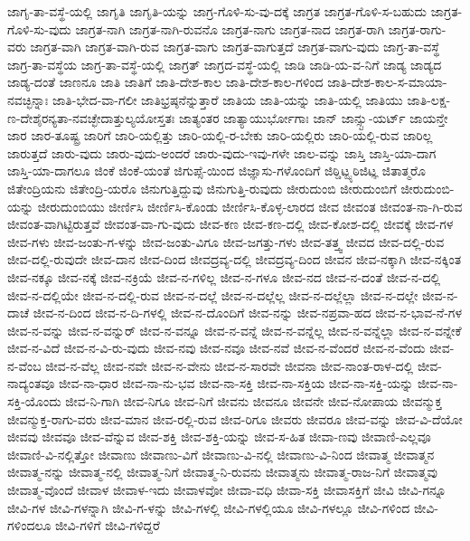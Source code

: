 {ಜಾಗೃ-ತಾ-ವಸ್ಥೆ-ಯಲ್ಲಿ
ಜಾಗೃತಿ
ಜಾಗೃತಿ-ಯನ್ನು
ಜಾಗ್ರ-ಗೊಳಿ-ಸು-ವು-ದಕ್ಕೆ
ಜಾಗ್ರತ
ಜಾಗ್ರತ-ಗೊಳಿ-ಸ-ಬಹುದು
ಜಾಗ್ರತ-ಗೊಳಿ-ಸು-ವುದು
ಜಾಗ್ರತ-ನಾಗಿ
ಜಾಗ್ರತ-ನಾಗಿ-ರುವನೊ
ಜಾಗ್ರತ-ನಾಗು
ಜಾಗ್ರತ-ನಾದ
ಜಾಗ್ರತ-ರಾಗಿ
ಜಾಗ್ರತ-ರಾಗು-ವರು
ಜಾಗ್ರತ-ವಾಗಿ
ಜಾಗ್ರತ-ವಾಗಿ-ರುವ
ಜಾಗ್ರತ-ವಾಗು
ಜಾಗ್ರತ-ವಾಗುತ್ತದೆ
ಜಾಗ್ರತ-ವಾಗು-ವುದು
ಜಾಗ್ರ-ತಾ-ವಸ್ಥೆ
ಜಾಗ್ರ-ತಾ-ವಸ್ಥೆಯ
ಜಾಗ್ರ-ತಾ-ವಸ್ಥೆ-ಯಲ್ಲಿ
ಜಾಗ್ರತ್
ಜಾಗ್ರದ-ವಸ್ಥೆ-ಯಲ್ಲಿ
ಜಾಡಿ
ಜಾಡಿ-ಯ-ವ-ನಿಗೆ
ಜಾಡ್ಯ
ಜಾಡ್ಯದ
ಜಾಡ್ಯ-ದಂತೆ
ಜಾಣನೂ
ಜಾತಿ
ಜಾತಿಗೆ
ಜಾತಿ-ದೇಶ-ಕಾಲ
ಜಾತಿ-ದೇಶ-ಕಾಲ-ಗಳಿಂದ
ಜಾತಿ-ದೇಶ-ಕಾಲ-ಸ-ಮಾಯಾ-ನವಚ್ಛಿನ್ನಾಃ
ಜಾತಿ-ಭೇದ-ವಾ-ಗಲೀ
ಜಾತಿಭ್ರಷ್ಠನೆನ್ನುತ್ತಾರೆ
ಜಾತಿಯ
ಜಾತಿ-ಯನ್ನು
ಜಾತಿ-ಯಲ್ಲಿ
ಜಾತಿಯು
ಜಾತಿ-ಲಕ್ಷ-ಣ-ದೇಶೈರನ್ಯತಾ-ನವಚ್ಛೇದಾತ್ತುಲ್ಯಯೋಸ್ತತಃ
ಜಾತ್ಯಂತರ
ಜಾತ್ಯಾಯುರ್ಭೋಗಾಃ
ಜಾನ್
ಜಾನ್ಸ್ಟು-ಯರ್ಟ್
ಜಾಯನ್ತೇ
ಜಾರ
ಜಾರ-ತೂಷ್ಟ್ರ
ಜಾರಿಗೆ
ಜಾರಿ-ಯಲ್ಲಿತ್ತು
ಜಾರಿ-ಯಲ್ಲಿ-ರ-ಬೇಕು
ಜಾರಿ-ಯಲ್ಲಿರು
ಜಾರಿ-ಯಲ್ಲಿ-ರುವ
ಜಾರಿಲ್ಲ
ಜಾರುತ್ತದೆ
ಜಾರು-ವುದು
ಜಾರು-ವುದು-ಅಂದರೆ
ಜಾರು-ವುದು-ಇವು-ಗಳೇ
ಜಾಲ-ವನ್ನು
ಜಾಸ್ತಿ
ಜಾಸ್ತಿ-ಯಾ-ದಾಗ
ಜಾಸ್ತಿ-ಯಾ-ದಾಗಲೂ
ಜಿಂಕೆ
ಜಿಂಕೆ-ಯಂತೆ
ಜಿಗುಪ್ಸೆ-ಯಿಂದ
ಜಿಜ್ಞಾಸು-ಗಳೊಂದಿಗೆ
ಜಿಠ್ಡಿಟ್ಝ್ಠಠಿಜಿಟ್ಞ
ಜಿತಾತ್ಮರೊ
ಜಿತೇಂದ್ರಿಯನು
ಜಿತೇಂದ್ರಿ-ಯರೊ
ಜಿನುಗುತ್ತಿದ್ದುವು
ಜಿನುಗುತ್ತಿ-ರುವುದು
ಜೀರುದುಂಬಿ
ಜೀರುದುಂಬಿಗೆ
ಜೀರುದುಂಬಿ-ಯನ್ನು
ಜೀರುದುಂಬಿಯು
ಜೀರ್ಣಿಸಿ
ಜೀರ್ಣಿಸಿ-ಕೊಂಡು
ಜೀರ್ಣಿಸಿ-ಕೊಳ್ಳ-ಲಾರದ
ಜೀವ
ಜೀವಂತ
ಜೀವಂತ-ನಾ-ಗಿ-ರುವ
ಜೀವಂತ-ವಾಗಿಟ್ಟಿರುತ್ತವೆ
ಜೀವಂತ-ವಾ-ಗು-ವುದು
ಜೀವ-ಕಣ
ಜೀವ-ಕಣ-ದಲ್ಲಿ
ಜೀವ-ಕೋಶ-ದಲ್ಲಿ
ಜೀವಕ್ಕೆ
ಜೀವ-ಗಳ
ಜೀವ-ಗಳು
ಜೀವ-ಜಂತು-ಗ-ಳನ್ನು
ಜೀವ-ಜಂತು-ವಿಗೂ
ಜೀವ-ಜಗತ್ತು-ಗಳು
ಜೀವ-ತತ್ತ್ವ
ಜೀವದ
ಜೀವ-ದಲ್ಲಿ-ರುವ
ಜೀವ-ದಲ್ಲಿ-ರುವುದೇ
ಜೀವ-ದಾನ
ಜೀವ-ದಿಂದ
ಜೀವದ್ರವ್ಯ-ದಲ್ಲಿ
ಜೀವದ್ರವ್ಯ-ದಿಂದ
ಜೀವನ
ಜೀವ-ನಕ್ಕಾಗಿ
ಜೀವ-ನಕ್ಕಿಂತ
ಜೀವ-ನಕ್ಕೂ
ಜೀವ-ನಕ್ಕೆ
ಜೀವ-ನಕ್ರಿಯೆ
ಜೀವ-ನ-ಗಳಿಲ್ಲ
ಜೀವ-ನ-ಗಳೂ
ಜೀವ-ನದ
ಜೀವ-ನ-ದಂತೆ
ಜೀವ-ನ-ದಲ್ಲಿ
ಜೀವ-ನ-ದಲ್ಲಿಯೇ
ಜೀವ-ನ-ದಲ್ಲಿ-ರುವ
ಜೀವ-ನ-ದಲ್ಲೆ
ಜೀವ-ನ-ದಲ್ಲೆಲ್ಲ
ಜೀವ-ನ-ದಲ್ಲೆಲ್ಲಾ
ಜೀವ-ನ-ದಲ್ಲೇ
ಜೀವ-ನ-ದಾಚೆ
ಜೀವ-ನ-ದಿಂದ
ಜೀವ-ನ-ದಿ-ಗಳಲ್ಲಿ
ಜೀವ-ನ-ದೊಂದಿಗೆ
ಜೀವ-ನನ್ನು
ಜೀವ-ನಪ್ರವಾ-ಹದ
ಜೀವ-ನ-ಭಾವ-ನೆ-ಗಳ
ಜೀವ-ನ-ವನ್ನು
ಜೀವ-ನ-ವನ್ನುರ್
ಜೀವ-ನ-ವನ್ನೂ
ಜೀವ-ನ-ವನ್ನೆ
ಜೀವ-ನ-ವನ್ನೆಲ್ಲ
ಜೀವ-ನ-ವನ್ನೆಲ್ಲಾ
ಜೀವ-ನ-ವನ್ನೇಕೆ
ಜೀವ-ನ-ವಿದೆ
ಜೀವ-ನ-ವಿ-ರು-ವುದು
ಜೀವ-ನವು
ಜೀವ-ನವೂ
ಜೀವ-ನವೆ
ಜೀವ-ನ-ವೆಂದರೆ
ಜೀವ-ನ-ವೆಂದು
ಜೀವ-ನ-ವೆಂಬ
ಜೀವ-ನ-ವೆಲ್ಲ
ಜೀವ-ನವೇ
ಜೀವ-ನ-ವೇನು
ಜೀವ-ನ-ಸಾರವೇ
ಜೀವನಾ
ಜೀವ-ನಾಂತ-ರಾಳ-ದಲ್ಲಿ
ಜೀವ-ನಾದ್ಯಂತವೂ
ಜೀವ-ನಾ-ಧಾರ
ಜೀವ-ನಾ-ನು-ಭವ
ಜೀವ-ನಾ-ಸಕ್ತಿ
ಜೀವ-ನಾ-ಸಕ್ತಿಯ
ಜೀವ-ನಾ-ಸಕ್ತಿ-ಯನ್ನು
ಜೀವ-ನಾ-ಸಕ್ತಿ-ಯೊಂದು
ಜೀವ-ನಿ-ಗಾಗಿ
ಜೀವ-ನಿಗೂ
ಜೀವ-ನಿಗೆ
ಜೀವನು
ಜೀವನೂ
ಜೀವನೇ
ಜೀವ-ನೋಪಾಯ
ಜೀವನ್ಮುಕ್ತ
ಜೀವನ್ಮುಕ್ತ-ರಾಗು-ವರು
ಜೀವ-ಮಾನ
ಜೀವ-ರಲ್ಲಿ-ರುವ
ಜೀವ-ರಿಗೂ
ಜೀವರು
ಜೀವರೂ
ಜೀವ-ವನ್ನು
ಜೀವ-ವಿ-ದೆಯೋ
ಜೀವವು
ಜೀವವೂ
ಜೀವ-ವೆನ್ನುವ
ಜೀವ-ಶಕ್ತಿ
ಜೀವ-ಶಕ್ತಿ-ಯನ್ನು
ಜೀವ-ಸ-ಹಿತ
ಜೀವಾ-ಣವು
ಜೀವಾಣಿ-ಎಲ್ಲವೂ
ಜೀವಾಣಿ-ವಿ-ನಲ್ಲಿತ್ತೋ
ಜೀವಾಣು
ಜೀವಾಣು-ವಿಗೆ
ಜೀವಾಣು-ವಿ-ನಲ್ಲಿ
ಜೀವಾಣು-ವಿ-ನಿಂದ
ಜೀವಾತ್ಮ
ಜೀವಾತ್ಮನ
ಜೀವಾತ್ಮ-ನನ್ನು
ಜೀವಾತ್ಮ-ನಲ್ಲಿ
ಜೀವಾತ್ಮ-ನಿಗೆ
ಜೀವಾತ್ಮ-ನಿ-ರುವನು
ಜೀವಾತ್ಮನು
ಜೀವಾತ್ಮ-ರಾಜ-ನಿಗೆ
ಜೀವಾತ್ಮವು
ಜೀವಾತ್ಮ-ವೊಂದೆ
ಜೀವಾಳ
ಜೀವಾಳ-ಇದು
ಜೀವಾಳವೋ
ಜೀವಾ-ವಧಿ
ಜೀವಾ-ಸಕ್ತಿ
ಜೀವಾಸಕ್ತಿಗೆ
ಜೀವಿ
ಜೀವಿ-ಗನ್ನೂ
ಜೀವಿ-ಗಳ
ಜೀವಿ-ಗಳನ್ನಾಗಿ
ಜೀವಿ-ಗ-ಳನ್ನು
ಜೀವಿ-ಗಳಲ್ಲಿ
ಜೀವಿ-ಗಳಲ್ಲಿಯೂ
ಜೀವಿ-ಗಳಲ್ಲೂ
ಜೀವಿ-ಗಳಿಂದ
ಜೀವಿ-ಗಳಿಂದಲೂ
ಜೀವಿ-ಗಳಿಗೆ
ಜೀವಿ-ಗಳಿದ್ದರೆ
}
